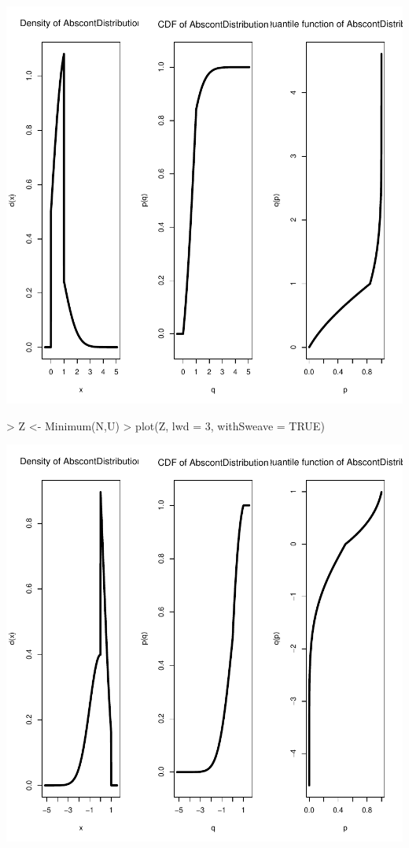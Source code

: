 \documentclass[11pt]{article}
\begin{document}
\includegraphics{distr-minandmax}
\begin{Schunk}
\begin{Sinput}
> Z <- Minimum(N,U)
> plot(Z, lwd = 3, withSweave = TRUE)
\end{Sinput}
\end{Schunk}
\includegraphics{distr-min}
\end{document}
